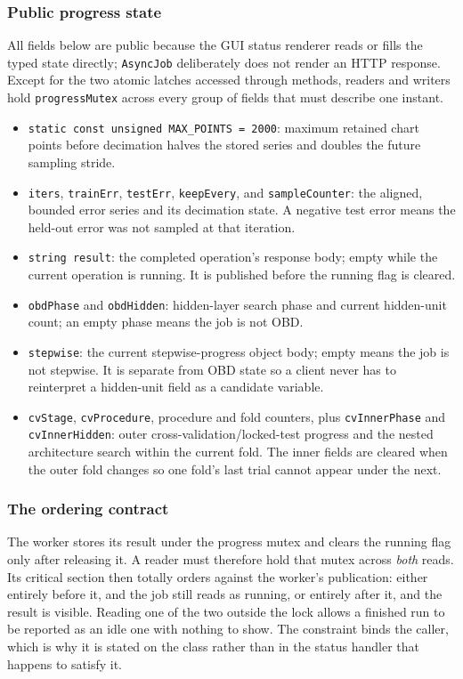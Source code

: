 \subsubsection{Public progress state}
All fields below are public because the GUI status renderer reads or fills the
typed state directly; \texttt{AsyncJob} deliberately does not render an HTTP
response.  Except for the two atomic latches accessed through methods, readers
and writers hold \texttt{progressMutex} across every group of fields that must
describe one instant.

\begin{itemize}
\item \texttt{static const unsigned MAX\_POINTS = 2000}: maximum retained chart
      points before decimation halves the stored series and doubles the future
      sampling stride.
\item \texttt{iters}, \texttt{trainErr}, \texttt{testErr},
      \texttt{keepEvery}, and \texttt{sampleCounter}: the aligned,
      bounded error series and its decimation state.  A negative test error
      means the held-out error was not sampled at that iteration.
\item \texttt{string result}: the completed operation's response body; empty
      while the current operation is running.  It is published before the
      running flag is cleared.
\item \texttt{obdPhase} and \texttt{obdHidden}: hidden-layer search phase and
      current hidden-unit count; an empty phase means the job is not OBD.
\item \texttt{stepwise}: the current stepwise-progress object body; empty means
      the job is not stepwise.  It is separate from OBD state so a client never
      has to reinterpret a hidden-unit field as a candidate variable.
\item \texttt{cvStage}, \texttt{cvProcedure}, procedure and fold counters, plus
      \texttt{cvInnerPhase} and \texttt{cvInnerHidden}: outer
      cross-validation/locked-test progress and the nested architecture search
      within the current fold.  The inner fields are cleared when the outer
      fold changes so one fold's last trial cannot appear under the next.
\end{itemize}

\subsubsection{The ordering contract}
The worker stores its result under the progress mutex and clears the running
flag only after releasing it.  A reader must therefore hold that mutex across
\emph{both} reads.  Its critical section then totally orders against the
worker's publication: either entirely before it, and the job still reads as
running, or entirely after it, and the result is visible.  Reading one of the
two outside the lock allows a finished run to be reported as an idle one with
nothing to show.  The constraint binds the caller, which is why it is stated on
the class rather than in the status handler that happens to satisfy it.

